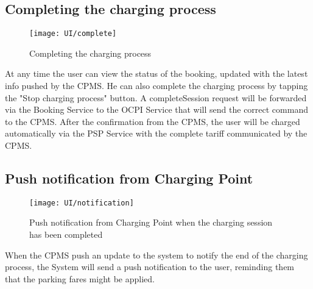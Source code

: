 \subsection{Completing the charging process}
\begin{figure}[h]
\texttt{[image: UI/complete]}
\caption{Completing the charging process}
\end{figure}

At any time the user can view the status of the booking, updated with the latest info pushed by the CPMS. He can also complete the charging process by tapping the "Stop charging process" button. A completeSession request will be forwarded via the Booking Service to the OCPI Service that will send the correct command to the CPMS. After the confirmation from the CPMS, the user will be charged automatically via the PSP Service with the complete tariff communicated by the CPMS.
\clearpage

\subsection{Push notification from Charging Point}
\begin{figure}[h]
\centering
\texttt{[image: UI/notification]}
\caption{Push notification from Charging Point when the charging session has been completed}
\end{figure}

When the CPMS push an update to the system to notify the end of the charging process, the System will send a push notification to the user, reminding them that the parking fares might be applied.









